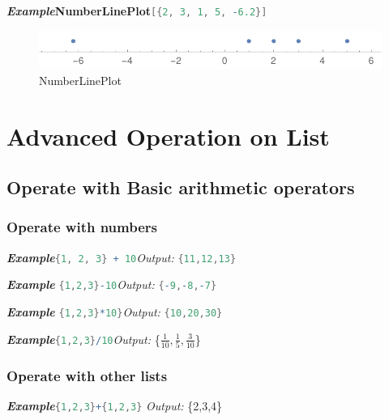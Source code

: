 \documentclass[a4paper]{book}
\begin{document}
\emph{\textbf{Example}}\quad\textbf{NumberLinePlot}\lstinline[language=Mathematica]|[{2, 3, 1, 5, -6.2}]|

\begin{figure}[H]
  \centering
  \includegraphics[width=0.45\linewidth]{figures/NumberLinePlot}
  \caption{NumberLinePlot}
\end{figure}






\section{Advanced Operation on List}
\label{sec:label}

\subsection{Operate with Basic arithmetic operators}
\label{subsec:label}

\subsubsection{Operate with numbers}
\noindent\emph{\textbf{Example}}\quad\lstinline[language=Mathematica]|{1, 2, 3} + 10|\hspace{\fill}\emph{Output:} \lstinline[language=Mathematica]|{11,12,13}|

\noindent\emph{\textbf{Example}}\quad
\lstinline[language=Mathematica]|{1,2,3}-10|\hspace{\fill}\emph{Output:} \lstinline[language=Mathematica]|{-9,-8,-7}|


\noindent\emph{\textbf{Example}}\quad
\lstinline[language=Mathematica]|{1,2,3}*10}|\hspace{\fill}\emph{Output:} \lstinline[language=Mathematica]|{10,20,30}|

\noindent\emph{\textbf{Example}}\quad\lstinline[language=Mathematica]|{1,2,3}/10|\hspace{\fill}\emph{Output:} \{$\frac{1}{10},\frac{1}{5},\frac{3}{10}$\}

\subsubsection{Operate with other lists}
\noindent\emph{\textbf{Example}}\quad \lstinline[language=Mathematica]|{1,2,3}+{1,2,3}| \hspace{\fill}\emph{Output:} \{2,3,4\}
\end{document}
